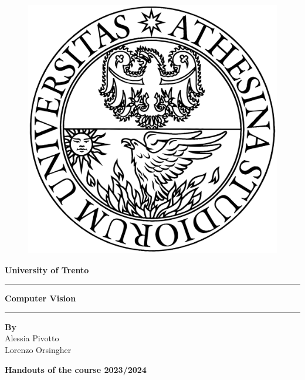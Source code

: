 \begin{titlepage}
   \begin{figure}
         \centering
         \includegraphics[scale=0.1]{Figures/logo2.png}
      \end{figure}
      \begin{center}
         \centering
         \vspace*{1cm}
         
         \textbf{\LARGE University of Trento}
         
         \vspace{1cm}
         \rule{\linewidth}{0.5mm}
         \vspace{0.1cm} 
         
         \textbf{\LARGE Computer Vision}
         
         \vspace{0.1cm}
         \rule{\linewidth}{0.5mm}
         \vspace{1cm} 
         
         \textbf{\textbf{By}} \\
         Alessia Pivotto \\ 
         Lorenzo Orsingher

         \vspace{1.5cm}
   \textbf{Handouts of the course 2023/2024}\\      
   \vspace{0.5cm}
           
      \end{center}
   \end{titlepage}